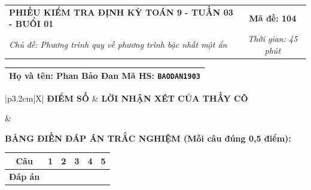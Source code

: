 \documentclass[12pt,a4paper]{article}
\begin{document}
\newpage


\noindent
\begin{tabularx}{\linewidth}{|X|c|}
\hline
\textbf{PHIẾU KIỂM TRA ĐỊNH KỲ TOÁN 9 - TUẦN 03 - BUỔI 01} & \textbf{Mã đề: 104} \\
\textit{Chủ đề: Phương trình quy về phương trình bậc nhất một ẩn} & \textit{Thời gian: 45 phút} \\
\hline
\end{tabularx}

\vspace{1mm}

\noindent
\begin{tabularx}{\linewidth}{|X|}
\hline
\rule[-2mm]{0pt}{7.5mm}\textbf{Họ và tên:} \textbf{\large Phan Bảo Đan} \hfill \textbf{Mã HS:} \texttt{BAODAN1903} \quad \\
\hline
\end{tabularx}

\vspace{1mm}

\noindent
\begin{tabularx}{\linewidth}{|p{3.2cm}|X|}
\hline
\centering\textbf{ĐIỂM SỐ} & \centering\textbf{LỜI NHẬN XÉT CỦA THẦY CÔ} \tabularnewline
\hline
\rule{0pt}{1.3cm} & \tabularnewline
\hline
\end{tabularx}

\vspace{1.2mm}

\noindent\textbf{BẢNG ĐIỀN ĐÁP ÁN TRẮC NGHIỆM (Mỗi câu đúng 0,5 điểm):}
\vspace{0.8mm}

\noindent
\renewcommand{\arraystretch}{1.35}
\begin{tabularx}{\linewidth}{|c|*{5}{>{\centering\arraybackslash}X|}}
\hline
\textbf{Câu} & \textbf{1} & \textbf{2} & \textbf{3} & \textbf{4} & \textbf{5} \\
\hline
\textbf{Đáp án} & & & & & \\
\hline
\end{tabularx}
\renewcommand{\arraystretch}{1.0}

\vspace{1.5mm}
\end{document}
